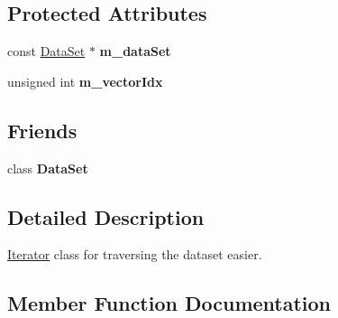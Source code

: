 \subsection*{Protected Attributes}
\begin{DoxyCompactItemize}
\item 
const \hyperlink{class_lots_of_lines_1_1_data_set}{Data\+Set} $\ast$ {\bfseries m\+\_\+data\+Set}\hypertarget{class_lots_of_lines_1_1_data_set_1_1_iterator_ada58776aa7f1f0ff1d1d217e05b3dc4c}{}\label{class_lots_of_lines_1_1_data_set_1_1_iterator_ada58776aa7f1f0ff1d1d217e05b3dc4c}

\item 
unsigned int {\bfseries m\+\_\+vector\+Idx}\hypertarget{class_lots_of_lines_1_1_data_set_1_1_iterator_ae0c142ecd8398e46ef10625acdbe410d}{}\label{class_lots_of_lines_1_1_data_set_1_1_iterator_ae0c142ecd8398e46ef10625acdbe410d}

\end{DoxyCompactItemize}
\subsection*{Friends}
\begin{DoxyCompactItemize}
\item 
class {\bfseries Data\+Set}\hypertarget{class_lots_of_lines_1_1_data_set_1_1_iterator_aef648af6c56fa8ee0738c93629e725dc}{}\label{class_lots_of_lines_1_1_data_set_1_1_iterator_aef648af6c56fa8ee0738c93629e725dc}

\end{DoxyCompactItemize}


\subsection{Detailed Description}
\hyperlink{class_lots_of_lines_1_1_data_set_1_1_iterator}{Iterator} class for traversing the dataset easier. 

\subsection{Member Function Documentation}
